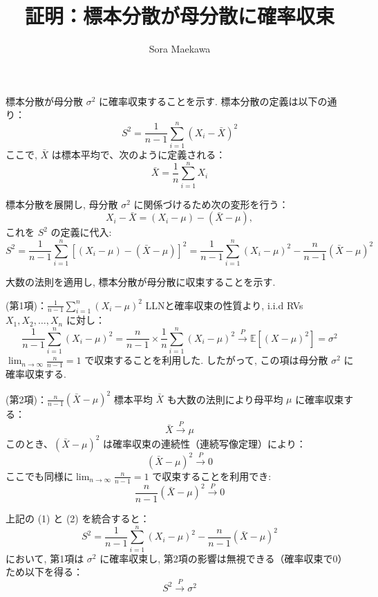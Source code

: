 \documentclass[paper=a4paper,fontsize=9pt]{jlreq}
\begin{document}
\title{証明：標本分散が母分散に確率収束}
\author{Sora Maekawa}
\maketitle

標本分散が母分散 \(\sigma^2\) に確率収束することを示す.
標本分散の定義は以下の通り：
\[
S^2 = \frac{1}{n-1} \sum_{i=1}^n (X_i - \bar{X})^2
\]
ここで, \(\bar{X}\) は標本平均で、次のように定義される：
\[
\bar{X} = \frac{1}{n} \sum_{i=1}^n X_i
\]

標本分散を展開し, 母分散 \(\sigma^2\) に関係づけるため次の変形を行う：
\[
X_i - \bar{X} = (X_i - \mu) - (\bar{X} - \mu),
\]
これを \( S^2 \) の定義に代入:
\[
S^2 = \frac{1}{n-1} \sum_{i=1}^n \left[ (X_i - \mu) - (\bar{X} - \mu) \right]^2 = \frac{1}{n-1} \sum_{i=1}^n (X_i - \mu)^2 - \frac{n}{n-1} (\bar{X} - \mu)^2
\]

大数の法則を適用し, 標本分散が母分散に収束することを示す.

(第1項)：\(\frac{1}{n-1} \sum_{i=1}^n (X_i - \mu)^2\)
LLNと確率収束の性質より, i.i.d RVs \( X_1, X_2, \dots, X_n \) に対し：
\[
\frac{1}{n-1} \sum_{i=1}^n (X_i - \mu)^2 = \frac{n}{n-1} \times \frac{1}{n} \sum_{i=1}^n (X_i - \mu)^2 \xrightarrow{P} \mathbb{E}[(X - \mu)^2] = \sigma^2
\]
\( \lim_{n \rightarrow \infty}\frac{n}{n-1} = 1\) で収束することを利用した. したがって, この項は母分散 \(\sigma^2\) に確率収束する.

(第2項)：\( \frac{n}{n-1}(\bar{X} - \mu)^2 \)
標本平均 \(\bar{X}\) も大数の法則により母平均 \(\mu\) に確率収束する：
\[
\bar{X} \xrightarrow{P} \mu
\]
このとき、\((\bar{X} - \mu)^2\) は確率収束の連続性（連続写像定理）により：
\[
(\bar{X} - \mu)^2 \xrightarrow{P} 0
\]
ここでも同様に\( \lim_{n \rightarrow \infty}\frac{n}{n-1} = 1\) で収束することを利用でき:
\[
\frac{n}{n-1}(\bar{X} - \mu)^2 \xrightarrow{P} 0
\]

上記の (1) と (2) を統合すると：
\[
S^2 = \frac{1}{n-1} \sum_{i=1}^n (X_i - \mu)^2 - \frac{n}{n-1} (\bar{X} - \mu)^2
\]
において, 第1項は \(\sigma^2\) に確率収束し, 第2項の影響は無視できる（確率収束で0）ため以下を得る：
\[
S^2 \xrightarrow{P} \sigma^2
\]
\end{document}
